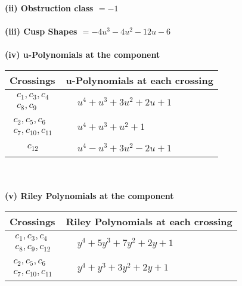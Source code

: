 \documentclass[1p]{elsarticle_modified}
\theoremstyle{definition}
\begin{document}
\flushleft \textbf{(ii) Obstruction class $= -1$}\\~\\
\flushleft \textbf{(iii) Cusp Shapes $= -4 u^3-4 u^2-12 u-6$}\\~\\
\newpage\renewcommand{\arraystretch}{1}
\flushleft \textbf{(iv) u-Polynomials at the component}\newline \\
\begin{tabular}{m{50pt}|m{274pt}}
Crossings & \hspace{64pt}u-Polynomials at each crossing \\
\hline $$\begin{aligned}c_{1},c_{3},c_{4}\\c_{8},c_{9}\end{aligned}$$&$\begin{aligned}
&u^4+u^3+3 u^2+2 u+1
\end{aligned}$\\
\hline $$\begin{aligned}c_{2},c_{5},c_{6}\\c_{7},c_{10},c_{11}\end{aligned}$$&$\begin{aligned}
&u^4+u^3+u^2+1
\end{aligned}$\\
\hline $$\begin{aligned}c_{12}\end{aligned}$$&$\begin{aligned}
&u^4- u^3+3 u^2-2 u+1
\end{aligned}$\\
\hline
\end{tabular}\\~\\
\newpage\renewcommand{\arraystretch}{1}
\flushleft \textbf{(v) Riley Polynomials at the component}\newline \\
\begin{tabular}{m{50pt}|m{274pt}}
Crossings & \hspace{64pt}Riley Polynomials at each crossing \\
\hline $$\begin{aligned}c_{1},c_{3},c_{4}\\c_{8},c_{9},c_{12}\end{aligned}$$&$\begin{aligned}
&y^4+5 y^3+7 y^2+2 y+1
\end{aligned}$\\
\hline $$\begin{aligned}c_{2},c_{5},c_{6}\\c_{7},c_{10},c_{11}\end{aligned}$$&$\begin{aligned}
&y^4+y^3+3 y^2+2 y+1
\end{aligned}$\\
\hline
\end{tabular}\\~\\
\end{document}
